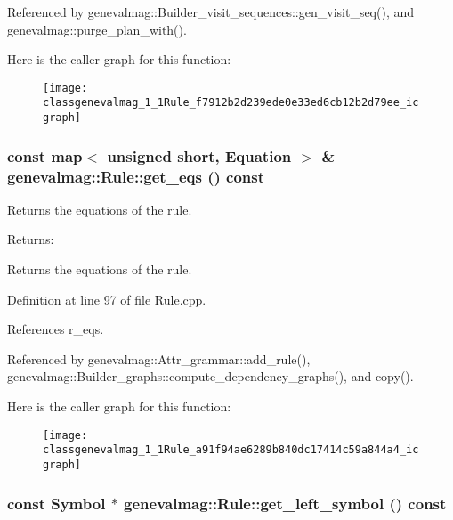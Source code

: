 Referenced by genevalmag::Builder\_\-visit\_\-sequences::gen\_\-visit\_\-seq(), and genevalmag::purge\_\-plan\_\-with().

Here is the caller graph for this function:\nopagebreak
\begin{figure}[H]
\begin{center}
\leavevmode
\texttt{[image: classgenevalmag\_1\_1Rule\_f7912b2d239ede0e33ed6cb12b2d79ee\_icgraph]}
\end{center}
\end{figure}
\hypertarget{classgenevalmag_1_1Rule_a91f94ae6289b840dc17414c59a844a4}{
\subsubsection[{get\_\-eqs}]{\setlength{\rightskip}{0pt plus 5cm}const map$<$ unsigned short, {\bf Equation} $>$ \& genevalmag::Rule::get\_\-eqs () const}}
\label{classgenevalmag_1_1Rule_a91f94ae6289b840dc17414c59a844a4}


Returns the equations of the rule. \begin{Desc}
\item[Returns:]\end{Desc}
Returns the equations of the rule. 

Definition at line 97 of file Rule.cpp.

References r\_\-eqs.

Referenced by genevalmag::Attr\_\-grammar::add\_\-rule(), genevalmag::Builder\_\-graphs::compute\_\-dependency\_\-graphs(), and copy().

Here is the caller graph for this function:\nopagebreak
\begin{figure}[H]
\begin{center}
\leavevmode
\texttt{[image: classgenevalmag\_1\_1Rule\_a91f94ae6289b840dc17414c59a844a4\_icgraph]}
\end{center}
\end{figure}
\hypertarget{classgenevalmag_1_1Rule_4d67205ef292350a440a10f7bbdda0e1}{
\subsubsection[{get\_\-left\_\-symbol}]{\setlength{\rightskip}{0pt plus 5cm}const {\bf Symbol} $\ast$ genevalmag::Rule::get\_\-left\_\-symbol () const}}
\label{classgenevalmag_1_1Rule_4d67205ef292350a440a10f7bbdda0e1}


